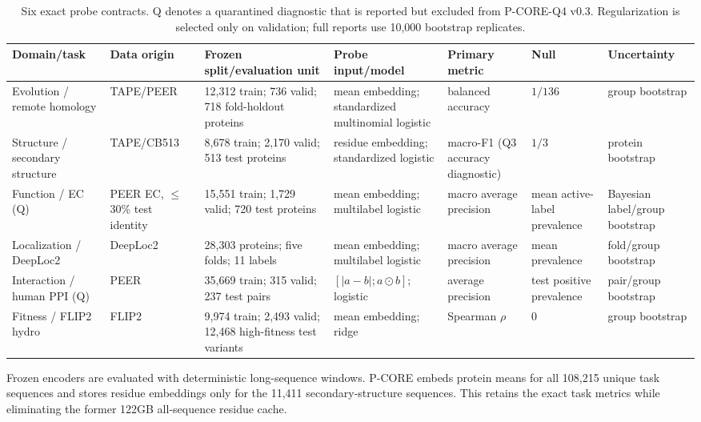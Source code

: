 \documentclass{article}
\begin{document}
\begin{table}[H]
  \centering
  \scriptsize
  \setlength{\tabcolsep}{3pt}
  \begin{tabularx}{\textwidth}{@{}p{}p{}p{}p{}p{}YY@{}}
    \toprule
    Domain/task & Data origin & Frozen split/evaluation unit & Probe input/model & Primary metric & Null & Uncertainty \\
    \midrule
    Evolution / remote homology & TAPE/PEER & 12,312 train; 736 valid; 718 fold-holdout proteins & mean embedding; standardized multinomial logistic & balanced accuracy & $1/136$ & group bootstrap \\
    Structure / secondary structure & TAPE/CB513 & 8,678 train; 2,170 valid; 513 test proteins & residue embedding; standardized logistic & macro-F1 (Q3 accuracy diagnostic) & $1/3$ & protein bootstrap \\
    Function / EC (Q) & PEER EC, $\leq$30\% test identity & 15,551 train; 1,729 valid; 720 test proteins & mean embedding; multilabel logistic & macro average precision & mean active-label prevalence & Bayesian label/group bootstrap \\
    Localization / DeepLoc2 & DeepLoc2 & 28,303 proteins; five folds; 11 labels & mean embedding; multilabel logistic & macro average precision & mean prevalence & fold/group bootstrap \\
    Interaction / human PPI (Q) & PEER & 35,669 train; 315 valid; 237 test pairs & $[|a-b|;a\odot b]$; logistic & average precision & test positive prevalence & pair/group bootstrap \\
    Fitness / FLIP2 hydro & FLIP2 & 9,974 train; 2,493 valid; 12,468 high-fitness test variants & mean embedding; ridge & Spearman $\rho$ & 0 & group bootstrap \\
    \bottomrule
  \end{tabularx}
  \caption{Six exact probe contracts. Q denotes a quarantined diagnostic that is reported but excluded from P-CORE-Q4 v0.3. Regularization is selected only on validation; full reports use 10,000 bootstrap replicates.}
  \label{tab:pcore-composition}
\end{table}

Frozen encoders are evaluated with deterministic long-sequence windows. P-CORE
embeds protein means for all 108,215 unique task sequences and stores residue
embeddings only for the 11,411 secondary-structure sequences. This retains the
exact task metrics while eliminating the former 122GB all-sequence residue
cache.
\end{document}
